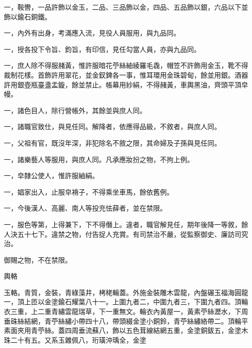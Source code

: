 \begin{pinyinscope}
 一，鞍轡，一品許飾以金玉，二品、三品飾以金，四品、五品飾以銀，六品以下並飾以鍮石銅鐵。



 一，內外有出身，考滿應入流，見役人員服用，與九品同。



 一，授各投下令旨、鈞旨，有印信，見任勾當人員，亦與九品同。



 一，庶人除不得服赭黃，惟許服暗花苧絲紬綾羅毛毳，帽笠不許飾用金玉，靴不得裁制花樣。首飾許用翠花，並金釵錍各一事，惟耳環用金珠碧甸，餘並用銀。酒器許用銀壺瓶臺盞盂鏇，餘並禁止。帳幕用紗絹，不得赭黃，車輿黑油，齊頭平頂皁幔。



 一，諸色目人，除行營帳外，其餘並與庶人同。



 一，諸職官致仕，與見任同。解降者，依應得品級，不敘者，與庶人同。



 一，父祖有官，既沒年深，非犯除名不敘之限，其命婦及子孫與見任同。



 一，諸樂藝人等服用，與庶人同。凡承應妝扮之物，不拘上例。



 一，皁隸公使人，惟許服紬絹。



 一，娼家出入，止服皁褙子，不得乘坐車馬，餘依舊例。



 一，今後漢人、高麗、南人等投充怯薛者，並在禁限。



 一，服色等第，上得兼下，下不得僭上。違者，職官解見任，期年後降一等敘，餘人決五十七下。違禁之物，付告捉人充賞。有司禁治不嚴，從監察御史、廉訪司究治。



 御賜之物，不在禁限。



 輿輅



 玉輅。青質，金裝，青綠藻井，栲栳輪蓋。外施金裝雕木雲龍，內盤碾玉福海圓龍一，頂上匝以金塗鍮石耀葉八十一。上圍九者二，中圍九者三，下圍九者四。頂輪衣三重，上二重青繡雲龍瑞草，下一重無文。輪衣內黃屋一，黃素苧絲瀝水，下周垂硃絲結網，青苧絲繡小帶四十八，帶頭綴金塗小銅鈴，青苧絲繡絡帶二。頂輪平素面夾用青苧絲。蓋四周垂流蘇八，飾以五色茸線結網五重，金塗銅鈸五，金塗木珠二十有五。又系玉雜佩八，珩璜沖瑀全，金塗




\end{pinyinscope}
